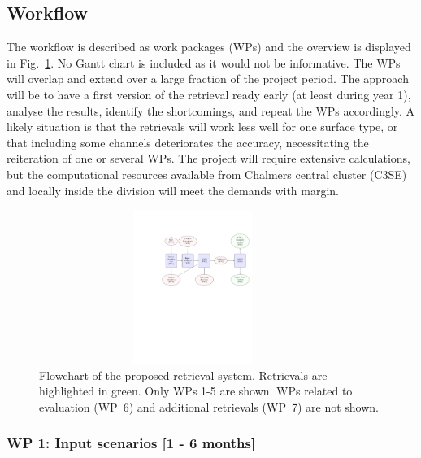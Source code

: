 \documentclass[12pt,oneside,a4paper]{article}
\begin{document}
\subsection{Workflow}
\label{sec:wp}


The workflow is described as work packages (WPs) and the overview is displayed
in Fig.~\ref{fig:flowchart}. No Gantt chart is included as it would not be
informative. The WPs will overlap and extend over a large fraction of the
project period. The approach will be to have a first version of the retrieval
ready early (at least during year 1), analyse the results, identify the
shortcomings, and repeat the WPs accordingly. A likely situation is that the
retrievals will work less well for one surface type, or that including some
channels deteriorates the accuracy, necessitating the reiteration of one or
several WPs. The project will require extensive calculations, but the
computational resources available from Chalmers central cluster (C3SE) and
locally inside the division will meet the demands with margin.

\begin{figure}
	\begin{minipage}[c]{0.75\textwidth}
		\includegraphics[trim=100 400 15 125,clip,height = 50mm, width=100mm]{flowchart.pdf}
	\end{minipage}\hfill
	\begin{minipage}[c]{0.24\textwidth}
      \caption{Flowchart of the proposed retrieval system. Retrievals are highlighted in green. Only WPs 1-5 are shown. WPs related to
        evaluation (WP~6) and additional retrievals (WP~7) are not shown.
      } \label{fig:flowchart}
	\end{minipage}
\end{figure}

\vspace{-1ex}

\subsubsection*{WP 1: Input scenarios [1 - 6 months]}
%
\end{document}
